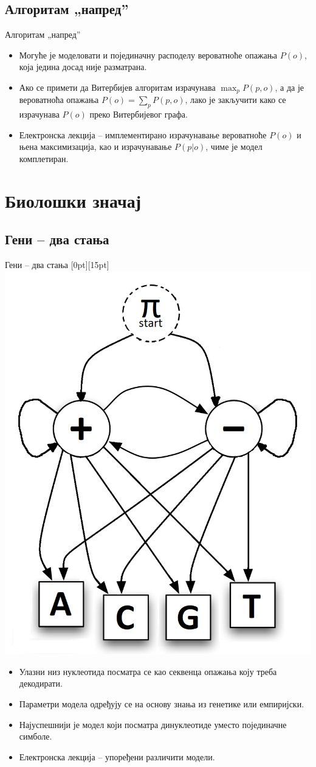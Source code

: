 \documentclass[hyperref={bookmarks=false}]{beamer}
\newcommand{\lenitem}[2][.43\linewidth]{\parbox[t]{#1}{\strut #2\strut}}
\begin{document}
\subsection{Алгоритам „напред”}
\begin{frame}{Алгоритам „напред”}
\begin{itemize}
\item Могуће је моделовати и појединачну расподелу вероватноће опажања $P(o)$, која једина досад није разматрана.
\item Ако се примети да Витербијев алгоритам израчунава $\max_p P(p, o)$, а да је вероватноћа опажања $P(o) = \sum_p P(p, o)$, лако је закључити како се израчунава $P(o)$ преко Витербијевог графа.
\item Електронска лекција -- имплементирано израчунавање вероватноће $P(o)$ и њена максимизација, као и израчунавање $P(p | o)$, чиме је модел комплетиран.
\end{itemize}
\end{frame}

\section{Биолошки значај}
\subsection{Гени -- два стања}
\begin{frame}{Гени -- два стања}
\mbox{}\hfill\raisebox{-\height}[0pt][15pt]{\includegraphics[width=.42\linewidth]{cg_graf.png}}
\vspace*{-\baselineskip}

\begin{itemize}
\item \lenitem{Улазни низ нуклеотида посматра се као секвенца опажања коју треба декодирати.}
\item \lenitem{Параметри модела одређују се на основу знања из генетике или емпиријски.}
\item \lenitem{Најуспешнији је модел који посматра динуклеотиде уместо појединачне симболе.}
\item \lenitem{Електронска лекција -- упоређени различити модели.}
\end{itemize}
\end{frame}
\end{document}
